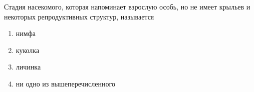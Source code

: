 
Стадия
насекомого, которая напоминает взрослую особь, но не имеет крыльев и некоторых
репродуктивных структур, называется

\begin{enumerate}
    \item нимфа 
    \item куколка 
    \item личинка 
    \item ни одно из вышеперечисленного
\end{enumerate}

